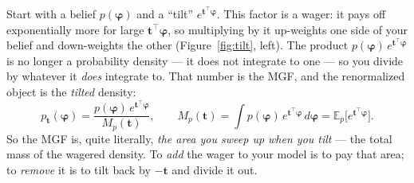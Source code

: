 \documentclass[11pt]{article}
\newcommand{\E}{\mathbb{E}}
\newcommand{\fvec}{\bm{\varphi}}    %
\theoremstyle{definition}
\begin{document}
Start with a belief $p(\fvec)$ and a ``tilt'' $e^{\bm t^{\top}\fvec}$. This
factor is a wager: it pays off exponentially more for large $\bm
t^{\top}\fvec$, so multiplying by it up-weights one side of your belief and
down-weights the other (Figure~\ref{fig:tilt}, left). The product
$p(\fvec)\,e^{\bm t^{\top}\fvec}$ is no longer a probability density --- it
does not integrate to one --- so you divide by whatever it \emph{does}
integrate to. That number is the MGF, and the renormalized object is the
\emph{tilted} density:
\begin{equation}
p_{\bm t}(\fvec)=\frac{p(\fvec)\,e^{\bm t^{\top}\fvec}}{M_p(\bm t)},
\qquad
M_p(\bm t)=\int p(\fvec)\,e^{\bm t^{\top}\fvec}\,d\fvec
=\E_p\!\big[e^{\bm t^{\top}\fvec}\big].
\label{eq:tiltdef}
\end{equation}
So the MGF is, quite literally, \emph{the area you sweep up when you tilt}
--- the total mass of the wagered density. To \emph{add} the wager to your
model is to pay that area; to \emph{remove} it is to tilt back by $-\bm t$
and divide it out.
\end{document}
